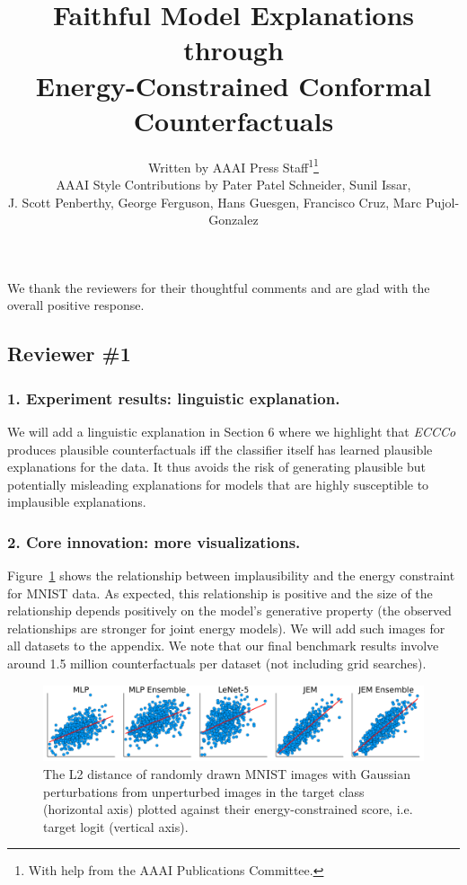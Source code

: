 \documentclass[letterpaper]{article} %
\title{Faithful Model Explanations through\\
Energy-Constrained Conformal Counterfactuals}
\author{
    Written by AAAI Press Staff\textsuperscript{\rm 1}\thanks{With help from the AAAI Publications Committee.}\\
    AAAI Style Contributions by Pater Patel Schneider,
    Sunil Issar,\\
    J. Scott Penberthy,
    George Ferguson,
    Hans Guesgen,
    Francisco Cruz\equalcontrib,
    Marc Pujol-Gonzalez\equalcontrib
}
\begin{document}
We thank the reviewers for their thoughtful comments and are glad with the overall positive response. 

\subsection*{Reviewer \#1}

\subsubsection{1. Experiment results: linguistic explanation.}  

We will add a linguistic explanation in Section 6 where we highlight that \textit{ECCCo} produces plausible counterfactuals iff the classifier itself has learned plausible explanations for the data. It thus avoids the risk of generating plausible but potentially misleading explanations for models that are highly susceptible to implausible explanations.

\subsubsection{2. Core innovation: more visualizations.} 

Figure~\ref{fig:poc} shows the relationship between implausibility and the energy constraint for MNIST data. As expected, this relationship is positive and the size of the relationship depends positively on the model's generative property (the observed relationships are stronger for joint energy models). We will add such images for all datasets to the appendix.  We note that our final benchmark results involve around 1.5 million counterfactuals per dataset (not including grid searches).

\begin{figure}[h]
    \centering
    \includegraphics[width=\linewidth]{../../www/dist_energy.png}
    \caption{The L2 distance of randomly drawn MNIST images with Gaussian perturbations from unperturbed images in the target class (horizontal axis) plotted against their energy-constrained score, i.e. target logit (vertical axis).}\label{fig:poc}
\end{figure}  
\end{document}
